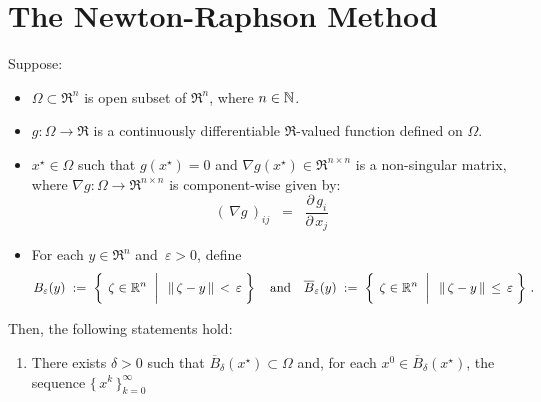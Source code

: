 

\section{The Newton-Raphson Method}
\setcounter{theorem}{0}
\setcounter{equation}{0}

\renewcommand{\theenumi}{\roman{enumi}}
\renewcommand{\labelenumi}{\textnormal{(\theenumi)}$\;\;$}


\begin{theorem}
\mbox{}\vskip 0.1cm
\noindent
Suppose:
\begin{itemize}
\item
	$\Omega \subset \Re^{n}$ is open subset of $\Re^{n}$, where $n \in \mathbb{N}$.
\item
	$g : \Omega \longrightarrow \Re$ is a continuously differentiable $\Re$-valued function
	defined on $\Omega$.
\item
	$x^{\star} \in \Omega$ such that $g(x^{\star}) = 0$ and
	$\nabla g(x^{\star}) \in \Re^{n \times n}$ is a non-singular matrix,
	where $\nabla g : \Omega \longrightarrow \Re^{n \times n}$ is component-wise given by:
	\begin{equation*}
	(\,\nabla g\,)_{ij}
	\;\; = \;\;
		\dfrac{\partial\,g_{i}}{\partial\,x_{j}}
	\end{equation*}
\item
	For each $y \in \Re^{n}$ and \,$\varepsilon > 0$, define
	\begin{equation*}
	B_{\varepsilon}(y)
	\; := \;
		\left\{\;\left.
		\zeta \overset{{\color{white}+}}{\in} \Re^{n}
		\;\;\right\vert\;\;
		\Vert\,\zeta - y\,\Vert \,<\, \varepsilon
		\;\right\}
	\quad\textnormal{and}\quad
	\overline{B}_{\varepsilon}(y)
	\; := \;
		\left\{\;\left.
		\zeta \overset{{\color{white}+}}{\in} \Re^{n}
		\;\;\right\vert\;\;
		\Vert\,\zeta - y\,\Vert \,\leq\, \varepsilon
		\;\right\}\,.
	\end{equation*}
\end{itemize}
Then, the following statements hold:
\begin{enumerate}
\item
	There exists $\delta > 0$ such that $\overline{B}_{\delta}(x^{\star}) \subset \Omega$ and,
	for each $x^{0} \in \overline{B}_{\delta}(x^{\star})$, the sequence $\{\,x^{k}\,\}_{k=0}^{\infty}$

\end{enumerate}
\end{theorem}
